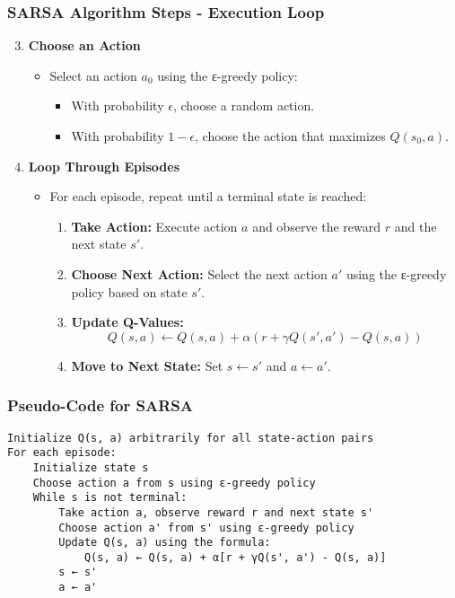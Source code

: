 \documentclass[aspectratio=169]{beamer}
\begin{document}
\begin{frame}[fragile]
    \frametitle{SARSA Algorithm Steps - Execution Loop}
    \begin{enumerate}
        \setcounter{enumi}{2}
        \item \textbf{Choose an Action}
        \begin{itemize}
            \item Select an action \( a_0 \) using the ε-greedy policy:
            \begin{itemize}
                \item With probability \( \epsilon \), choose a random action.
                \item With probability \( 1 - \epsilon \), choose the action that maximizes \( Q(s_0, a) \).
            \end{itemize}
        \end{itemize}
        \item \textbf{Loop Through Episodes}
        \begin{itemize}
            \item For each episode, repeat until a terminal state is reached:
            \begin{enumerate}
                \item \textbf{Take Action:} Execute action \( a \) and observe the reward \( r \) and the next state \( s' \).
                \item \textbf{Choose Next Action:} Select the next action \( a' \) using the ε-greedy policy based on state \( s' \).
                \item \textbf{Update Q-Values:}
                \begin{equation}
                    Q(s, a) \leftarrow Q(s, a) + \alpha \left( r + \gamma Q(s', a') - Q(s, a) \right)
                \end{equation}
                \item \textbf{Move to Next State:} Set \( s \leftarrow s' \) and \( a \leftarrow a' \).
            \end{enumerate}
        \end{itemize}
    \end{enumerate}
\end{frame}

\begin{frame}[fragile]
    \frametitle{Pseudo-Code for SARSA}
    \begin{lstlisting}
Initialize Q(s, a) arbitrarily for all state-action pairs
For each episode:
    Initialize state s
    Choose action a from s using ε-greedy policy
    While s is not terminal:
        Take action a, observe reward r and next state s'
        Choose action a' from s' using ε-greedy policy
        Update Q(s, a) using the formula:
            Q(s, a) ← Q(s, a) + α[r + γQ(s', a') - Q(s, a)]
        s ← s'
        a ← a'
    \end{lstlisting}
\end{frame}
\end{document}
